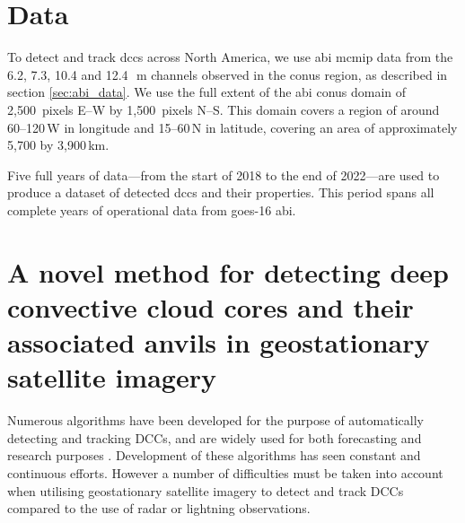\section{Data}

To detect and track \acrshort{dcc}s across North America, we use \acrshort{abi} \acrshort{mcmip} data from the 6.2, 7.3, 10.4 and 12.4\,\unit{\mu m} channels observed in the \acrshort{conus} region, as described in section \ref{sec:abi_data}.
We use the full extent of the \acrshort{abi} \acrshort{conus} domain of 2,500~pixels E--W by 1,500~pixels N--S.
This domain covers a region of around 60--120\,\textdegree W in longitude and 15--60\,\textdegree N in latitude, covering an area of approximately 5,700 by 3,900\,\unit{km}.



Five full years of data---from the start of 2018 to the end of 2022---are used to produce a dataset of detected \acrshort{dcc}s and their properties.
This period spans all complete years of operational data from \acrshort{goes}-16 \acrshort{abi}.



\section{A novel method for detecting deep convective cloud cores and their associated anvils in geostationary satellite imagery}

Numerous algorithms have been developed for the purpose of automatically detecting and tracking DCCs, and are widely used for both forecasting and research purposes \citep[e.g.][]{mecikalski_use_2011, senf_characterization_2015, senf_satellite-based_2017, feng_life_2012, feng_spatiotemporal_2019, zinner_cb-tram:_2008}.
Development of these algorithms has seen constant and continuous efforts.
However a number of difficulties must be taken into account when utilising geostationary satellite imagery to detect and track DCCs compared to the use of radar or lightning observations.

